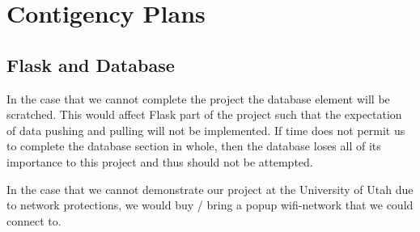 \documentclass[conference]{IEEEtran}
\begin{document}
\section{Contigency Plans}
\subsection{Flask and Database}
In the case that we cannot complete the project the database element will be scratched. This would affect
Flask part of the project such that the expectation of data pushing and pulling will not be implemented.
If time does not permit us to complete the database section in whole, then the database loses all 
of its importance to this project and thus should not be attempted.

In the case that we cannot demonstrate our project at the University of Utah due to network protections,
we would buy / bring a popup wifi-network that we could connect to.
 

% 
% 

{}

\end{document}
